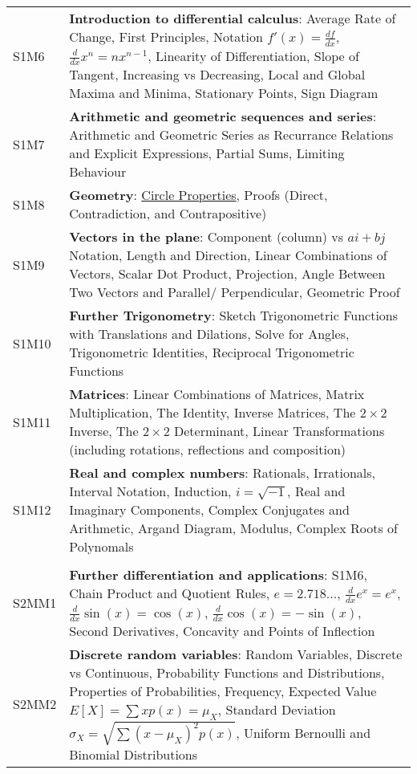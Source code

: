 \documentclass[varwidth=144mm, 12pt]{standalone}
\begin{document}
\begin{longtable}{lp{}}
S1M6 & \textbf{Introduction to differential calculus}: Average Rate of Change, First Principles, Notation $f'(x) = \frac{df}{dx}$, $\frac{d}{dx}x^n = nx^{n-1}$, Linearity of Differentiation, Slope of Tangent, Increasing vs Decreasing, Local and Global Maxima and Minima, Stationary Points, Sign Diagram \\
S1M7 & \textbf{Arithmetic and geometric sequences and series}: Arithmetic and Geometric Series as Recurrance Relations and Explicit Expressions, Partial Sums, Limiting Behaviour  \\
S1M8 & \textbf{Geometry}: \href{https://prezi.com/view/vpmCHdeFbIV2xlYHhZiK}{Circle Properties}, Proofs (Direct, Contradiction, and Contrapositive) \\
S1M9 & \textbf{Vectors in the plane}: Component (column) vs $ai + bj$ Notation, Length and Direction, Linear Combinations of Vectors, Scalar Dot Product, Projection, Angle Between Two Vectors and Parallel/ Perpendicular, Geometric Proof \\
S1M10 & \textbf{Further Trigonometry}: Sketch Trigonometric Functions with Translations and Dilations, Solve for Angles, Trigonometric Identities, Reciprocal Trigonometric Functions\\
S1M11 & \textbf{Matrices}: Linear Combinations of Matrices, Matrix Multiplication, The Identity, Inverse Matrices, The $2 \times 2$ Inverse, The $2 \times 2$ Determinant, Linear Transformations (including rotations, reflections and composition) \\
S1M12 & \textbf{Real and complex numbers}: Rationals, Irrationals, Interval Notation, Induction, $i = \sqrt{-1}$, Real and Imaginary Components, Complex Conjugates and Arithmetic, Argand Diagram, Modulus, Complex Roots of Polynomals \\
& \\
S2MM1 & \textbf{Further differentiation and applications}: S1M6, Chain Product and Quotient Rules, $e = 2.718...$, $\frac{d}{dx}e^x = e^x$,  $\frac{d}{dx}\sin(x) = \cos(x)$, $\frac{d}{dx}\cos(x) = -\sin(x)$, Second Derivatives, Concavity and Points of Inflection \\
S2MM2 & \textbf{Discrete random variables}: Random Variables, Discrete vs Continuous, Probability Functions and Distributions, Properties of Probabilities, Frequency, Expected Value $E[X] = \sum{xp(x)} = \mu_X$, Standard Deviation $\sigma_X = \sqrt{\sum{(x-\mu_X)^2p(x)}}$, Uniform Bernoulli and Binomial Distributions \\

\end{longtable}
\end{document}
